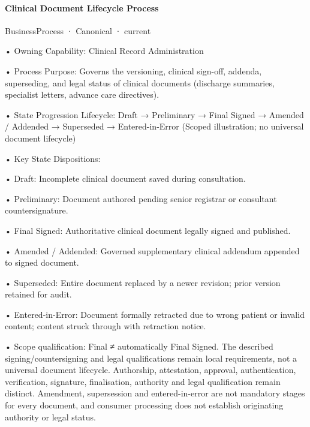 \paragraph{Clinical Document Lifecycle Process}

\label{element:eacdec16b96844b4963b8a960d1a8666}
{\small BusinessProcess · Canonical · current}\par

•
Owning Capability: Clinical Record Administration



•
Process Purpose: Governs the versioning, clinical sign-off, addenda, superseding, and legal status of clinical documents (discharge summaries, specialist letters, advance care directives).



•
State Progression Lifecycle: Draft → Preliminary → Final Signed → Amended / Addended → Superseded → Entered-in-Error   (Scoped illustration; no universal document lifecycle)



•
Key State Dispositions:



•
Draft: Incomplete clinical document saved during consultation.



•
Preliminary: Document authored pending senior registrar or consultant countersignature.



•
Final Signed: Authoritative clinical document legally signed and published.



•
Amended / Addended: Governed supplementary clinical addendum appended to signed document.



•
Superseded: Entire document replaced by a newer revision; prior version retained for audit.



•
Entered-in-Error: Document formally retracted due to wrong patient or invalid content; content struck through with retraction notice.



•
Scope qualification: Final ≠ automatically Final Signed. The described signing/countersigning and legal qualifications remain local requirements, not a universal document lifecycle. Authorship, attestation, approval, authentication, verification, signature, finalisation, authority and legal qualification remain distinct. Amendment, supersession and entered-in-error are not mandatory stages for every document, and consumer processing does not establish originating authority or legal status.



